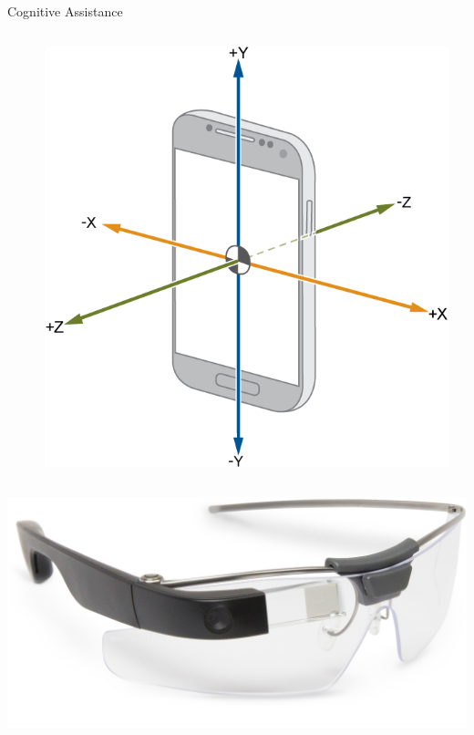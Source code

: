 \documentclass[aspectratio=1610]{beamer}
\begin{document}
\begin{frame}{Cognitive Assistance}
\begin{columns}[onlytextwidth]
\begin{column}{.1\linewidth}
        \end{column}%
        \begin{column}{.01\linewidth}
        \end{column}%
        \begin{column}{.1\linewidth}
            \centering%
            \includegraphics[width=\linewidth]{img/accel.png}
        \end{column}%
        \begin{column}{.335\linewidth}%
        \end{column}%
    \end{columns}%
    \begin{columns}[onlytextwidth]
        \begin{column}{.25\linewidth}
            \centering%
            \includegraphics[width=\linewidth]{img/glass_wearable.jpeg}\\

\end{column}
\end{columns}
\end{frame}
\end{document}
